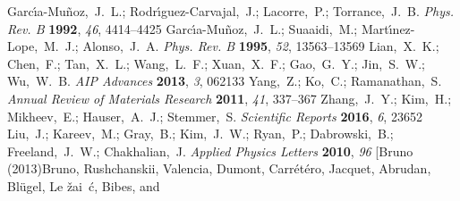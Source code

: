 \documentclass[aip,graphicx,numerical]{revtex4-1}
\begin{document}
\begin{mcitethebibliography}{33}
Garc\'{\i}a-Mu\~noz,~J.~L.; Rodr\'{\i}guez-Carvajal,~J.; Lacorre,~P.;
  Torrance,~J.~B. \emph{Phys. Rev. B} \textbf{1992}, \emph{46},
  4414--4425\relax
\mciteBstWouldAddEndPuncttrue
\mciteSetBstMidEndSepPunct{\mcitedefaultmidpunct}
{\mcitedefaultendpunct}{\mcitedefaultseppunct}\relax
\EndOfBibitem
{}
Garc{\'{\i}}a-Mu{\~{n}}oz,~J.~L.; Suaaidi,~M.; Mart{\'{\i}}nez-Lope,~M.~J.;
  Alonso,~J.~A. \emph{Phys. Rev. B} \textbf{1995}, \emph{52},
  13563--13569\relax
\mciteBstWouldAddEndPuncttrue
\mciteSetBstMidEndSepPunct{\mcitedefaultmidpunct}
{\mcitedefaultendpunct}{\mcitedefaultseppunct}\relax
\EndOfBibitem
{}
Lian,~X.~K.; Chen,~F.; Tan,~X.~L.; Wang,~L.~F.; Xuan,~X.~F.; Gao,~G.~Y.;
  Jin,~S.~W.; Wu,~W.~B. \emph{{AIP} Advances} \textbf{2013}, \emph{3},
  062133\relax
\mciteBstWouldAddEndPuncttrue
\mciteSetBstMidEndSepPunct{\mcitedefaultmidpunct}
{\mcitedefaultendpunct}{\mcitedefaultseppunct}\relax
\EndOfBibitem
{}
Yang,~Z.; Ko,~C.; Ramanathan,~S. \emph{Annual Review of Materials Research}
  \textbf{2011}, \emph{41}, 337--367\relax
\mciteBstWouldAddEndPuncttrue
\mciteSetBstMidEndSepPunct{\mcitedefaultmidpunct}
{\mcitedefaultendpunct}{\mcitedefaultseppunct}\relax
\EndOfBibitem
{}
Zhang,~J.~Y.; Kim,~H.; Mikheev,~E.; Hauser,~A.~J.; Stemmer,~S. \emph{Scientific
  Reports} \textbf{2016}, \emph{6}, 23652\relax
\mciteBstWouldAddEndPuncttrue
\mciteSetBstMidEndSepPunct{\mcitedefaultmidpunct}
{\mcitedefaultendpunct}{\mcitedefaultseppunct}\relax
\EndOfBibitem
{}
Liu,~J.; Kareev,~M.; Gray,~B.; Kim,~J.~W.; Ryan,~P.; Dabrowski,~B.;
  Freeland,~J.~W.; Chakhalian,~J. \emph{Applied Physics Letters} \textbf{2010},
  \emph{96}\relax
\mciteBstWouldAddEndPuncttrue
\mciteSetBstMidEndSepPunct{\mcitedefaultmidpunct}
{\mcitedefaultendpunct}{\mcitedefaultseppunct}\relax
\EndOfBibitem
\bibitem[Bruno (2013)Bruno, Rushchanskii, Valencia, Dumont,
  Carr\'et\'ero, Jacquet, Abrudan, Bl\"ugel, Le\ifmmode {}\else
  \v{z}\fi{}ai\ifmmode~\else \'{c}\fi{}, Bibes, and

\end{mcitethebibliography}
\end{document}
